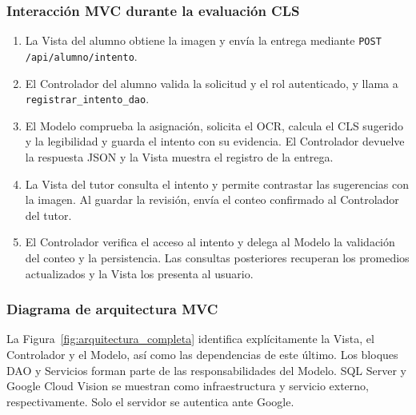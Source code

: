 \subsubsection{Interacción MVC durante la evaluación CLS}
\begin{enumerate}
    \item La Vista del alumno obtiene la imagen y envía la entrega mediante \texttt{POST /api/alumno/intento}.
    \item El Controlador del alumno valida la solicitud y el rol autenticado, y llama a \texttt{registrar\_intento\_dao}.
    \item El Modelo comprueba la asignación, solicita el OCR, calcula el CLS sugerido y la legibilidad y guarda el intento con su evidencia. El Controlador devuelve la respuesta JSON y la Vista muestra el registro de la entrega.
    \item La Vista del tutor consulta el intento y permite contrastar las sugerencias con la imagen. Al guardar la revisión, envía el conteo confirmado al Controlador del tutor.
    \item El Controlador verifica el acceso al intento y delega al Modelo la validación del conteo y la persistencia. Las consultas posteriores recuperan los promedios actualizados y la Vista los presenta al usuario.
\end{enumerate}

\subsubsection{Diagrama de arquitectura MVC}
La Figura~\ref{fig:arquitectura_completa} identifica explícitamente la Vista, el Controlador y el Modelo, así como las dependencias de este último. Los bloques DAO y Servicios forman parte de las responsabilidades del Modelo. SQL Server y Google Cloud Vision se muestran como infraestructura y servicio externo, respectivamente. Solo el servidor se autentica ante Google.

